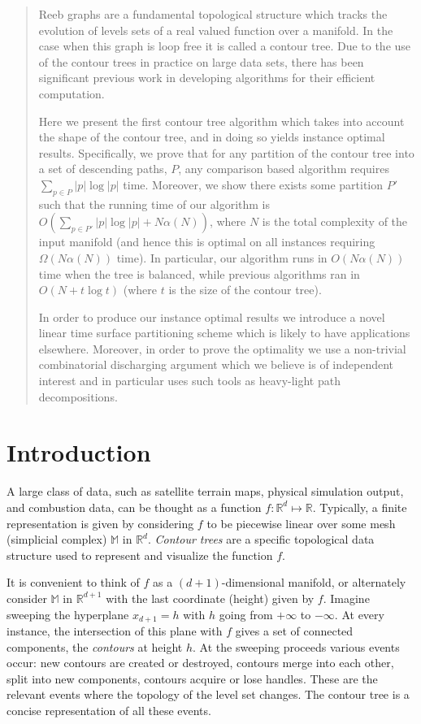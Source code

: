 \documentclass[11pt]{article}
\theoremstyle{definition}
\newcommand{\MM}{\mathbb{M}}
\newcommand{\RR}{\mathbb{R}}
\begin{document}
\begin{abstract}
{Reeb graphs are a fundamental topological structure which tracks the evolution of levels sets of a real valued function over a manifold.  
In the case when this graph is loop free it is called a contour tree.  Due to the use of the contour trees in practice on large data sets, 
there has been significant previous work in developing algorithms for their efficient computation. 

Here we present the first contour tree algorithm which takes into account the shape of the contour tree, 
and in doing so yields instance optimal results.
Specifically, we prove that for any partition of the contour tree into a set of descending paths, $P$, 
any comparison based algorithm requires $\sum_{p\in P} |p|\log|p|$ time.  Moreover, we show there   
exists some partition $P'$ such that the running time of our algorithm is 
$O(\sum_{p\in P'} |p|\log|p| + N\alpha(N))$, where $N$ is the total complexity of the input manifold 
(and hence this is optimal on all instances requiring $\Omega(N\alpha(N))$ time).
In particular, our algorithm runs in $O(N\alpha(N))$ time when the tree is balanced, 
while previous algorithms ran in $O(N+t\log t)$ (where $t$ is the size of the contour tree).

In order to produce our instance optimal results we introduce a novel linear time surface partitioning scheme which is likely to have applications elsewhere.
Moreover, in order to prove the optimality we use a non-trivial combinatorial discharging argument which we believe is of independent interest and in particular uses 
such tools as heavy-light path decompositions.
}
\end{abstract}


\section{Introduction}

A large class of data, such as satellite terrain maps, physical simulation output, and combustion data, can
be thought as a function $f: \RR^d \mapsto \RR$. Typically, a finite representation is given
by considering $f$ to be piecewise linear over some mesh (simplicial complex) $\MM$ in $\RR^d$.
\emph{Contour trees} are a specific topological data structure used to represent and visualize
the function $f$.

It is convenient to think of $f$ as a $(d+1)$-dimensional manifold, or alternately consider
$\MM$ in $\RR^{d+1}$ with the last coordinate (height) given by $f$. Imagine sweeping the hyperplane $x_{d+1} = h$
with $h$ going from $+\infty$ to $-\infty$. At every instance, the intersection of this plane 
with $f$ gives a set of connected components, the \emph{contours} at height $h$. At the sweeping 
proceeds various events occur: new contours are created or destroyed, contours merge into each other,
split into new components, contours acquire or lose handles. These are the relevant events where 
the topology of the level set changes. The contour tree is a concise representation of all these events.
\end{document}
